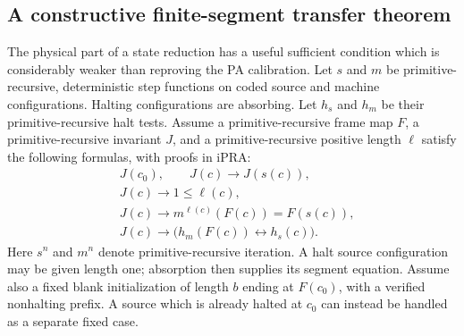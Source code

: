 \subsection{A constructive finite-segment transfer theorem}

The physical part of a state reduction has a useful sufficient condition
which is considerably weaker than reproving the PA calibration.
Let $s$ and $m$ be primitive-recursive, deterministic step functions on
coded source and machine configurations.  Halting configurations are
absorbing.  Let $h_s$ and $h_m$ be their primitive-recursive halt tests.
Assume a primitive-recursive frame map $F$, a primitive-recursive invariant
$J$, and a primitive-recursive positive length $\ell$ satisfy the following
formulas, with proofs in iPRA:
\begin{align*}
 &J(c_0),\qquad J(c)\longrightarrow J(s(c)),\\
 &J(c)\longrightarrow 1\leq\ell(c),\\
 &J(c)\longrightarrow m^{\ell(c)}(F(c))=F(s(c)),\\
 &J(c)\longrightarrow\bigl(h_m(F(c))\leftrightarrow h_s(c)\bigr).
\end{align*}
Here $s^n$ and $m^n$ denote primitive-recursive iteration.  A halt source
configuration may be given length one; absorption then supplies its
segment equation.  Assume also a fixed blank initialization of length
$b$ ending at $F(c_0)$, with a verified nonhalting prefix.  A source which
is already halted at $c_0$ can instead be handled as a separate fixed case.

